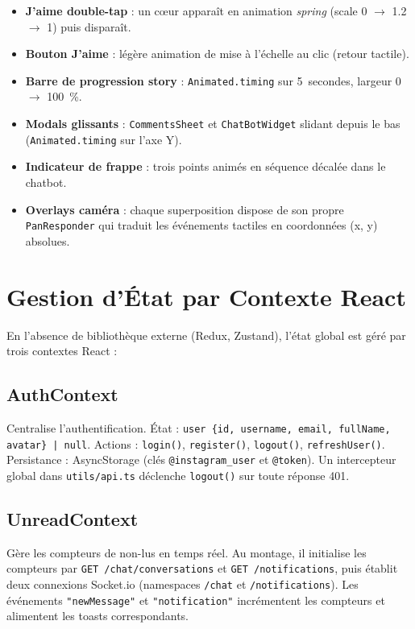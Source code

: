 \begin{itemize}
  \item \textbf{J'aime double-tap} : un c\oe{}ur apparaît en animation \textit{spring} (scale 0 $\to$ 1.2 $\to$ 1) puis disparaît.
  \item \textbf{Bouton J'aime} : légère animation de mise à l'échelle au clic (retour tactile).
  \item \textbf{Barre de progression story} : \texttt{Animated.timing} sur 5~secondes, largeur 0 $\to$ 100~\%.
  \item \textbf{Modals glissants} : \texttt{CommentsSheet} et \texttt{ChatBotWidget} slidant depuis le bas (\texttt{Animated.timing} sur l'axe Y).
  \item \textbf{Indicateur de frappe} : trois points animés en séquence décalée dans le chatbot.
  \item \textbf{Overlays caméra} : chaque superposition dispose de son propre \texttt{PanResponder} qui traduit les événements tactiles en coordonnées (x, y) absolues.
\end{itemize}

\section{Gestion d'État par Contexte React}

En l'absence de bibliothèque externe (Redux, Zustand), l'état global est géré par trois contextes React :

\subsection{AuthContext}
Centralise l'authentification. État : \texttt{user \{id, username, email, fullName, avatar\} | null}. Actions : \texttt{login()}, \texttt{register()}, \texttt{logout()}, \texttt{refreshUser()}. Persistance : AsyncStorage (clés \texttt{@instagram\_user} et \texttt{@token}). Un intercepteur global dans \texttt{utils/api.ts} déclenche \texttt{logout()} sur toute réponse 401.

\subsection{UnreadContext}
Gère les compteurs de non-lus en temps réel. Au montage, il initialise les compteurs par \texttt{GET /chat/conversations} et \texttt{GET /notifications}, puis établit deux connexions Socket.io (namespaces \texttt{/chat} et \texttt{/notifications}). Les événements \texttt{"newMessage"} et \texttt{"notification"} incrémentent les compteurs et alimentent les toasts correspondants.

